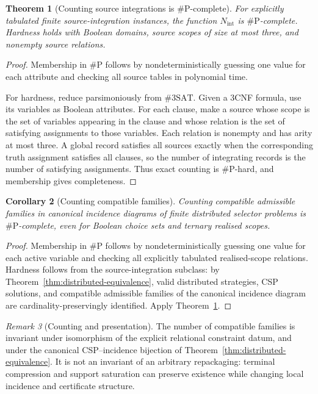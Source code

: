 \documentclass[11pt]{article}
\theoremstyle{plain}
\newtheorem{theorem}{Theorem}[section]
\newtheorem{corollary}[theorem]{Corollary}
\theoremstyle{definition}
\theoremstyle{remark}
\newtheorem{remark}[theorem]{Remark}
\begin{document}
\begin{theorem}[Counting source integrations is $\#\mathrm P$-complete]
\label{thm:source-integration-sharpP}
For explicitly tabulated finite source-integration instances, the function
$N_{\mathrm{int}}$ is $\#\mathrm P$-complete. Hardness holds with Boolean
domains, source scopes of size at most three, and nonempty source relations.
\end{theorem}

\begin{proof}
Membership in $\#\mathrm P$ follows by nondeterministically guessing one value
for each attribute and checking all source tables in polynomial time.

For hardness, reduce parsimoniously from $\#3\mathrm{SAT}$. Given a 3CNF formula,
use its variables as Boolean attributes. For each clause, make a source whose
scope is the set of variables appearing in the clause and whose relation is
the set of satisfying assignments to those variables. Each relation is nonempty
and has arity at most three. A global record satisfies all sources exactly when
the corresponding truth assignment satisfies all clauses, so the number of
integrating records is the number of satisfying assignments. Thus exact counting
is $\#\mathrm P$-hard, and membership gives completeness.
\end{proof}

\begin{corollary}[Counting compatible families]
\label{cor:counting-compatible-families}
Counting compatible admissible families in canonical incidence diagrams of
finite distributed selector problems is $\#\mathrm P$-complete, even for Boolean
choice sets and ternary realised scopes.
\end{corollary}

\begin{proof}
Membership in $\#\mathrm P$ follows by nondeterministically guessing one value
for each active variable and checking all explicitly tabulated realised-scope
relations. Hardness follows from the source-integration subclass: by
Theorem~\ref{thm:distributed-equivalence}, valid distributed strategies, CSP
solutions, and compatible admissible families of the canonical incidence diagram
are cardinality-preservingly identified. Apply
Theorem~\ref{thm:source-integration-sharpP}.
\end{proof}

\begin{remark}[Counting and presentation]
The number of compatible families is invariant under isomorphism of the explicit
relational constraint datum, and under the canonical CSP--incidence bijection of
Theorem~\ref{thm:distributed-equivalence}. It is not an invariant of an
arbitrary repackaging: terminal compression and support saturation can preserve
existence while changing local incidence and certificate structure.
\end{remark}
\end{document}

